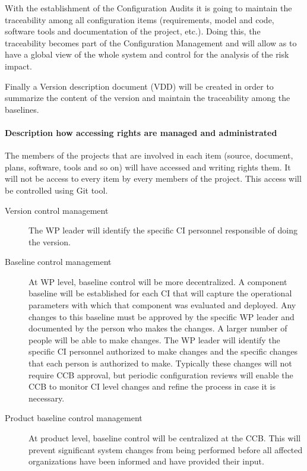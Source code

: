 \documentclass{template/openetcs_article}
\begin{document}
With the establishment of the Configuration Audits it is going to maintain the traceability among all configuration items (requirements, model and code, software tools and documentation of the project, etc.). Doing this, the traceability becomes part of the Configuration Management and will allow as to have a global view of the whole system and control for the analysis of the risk impact.



Finally a Version description document (VDD) will be created in order to summarize the content of the version and maintain the traceability among the baselines.


\paragraph{Description how accessing rights are managed and administrated}

The members of the projects that are involved in each item (source, document, plans, software, tools and so on) will have accessed and writing rights them. It will not be access to every item by every members of the project. This access will be controlled using Git tool.

\begin{description}
\item[Version control management]
The WP leader will identify the specific CI personnel responsible of doing the version.

\item[Baseline control management]
At WP level, baseline control will be more decentralized. A component baseline will be established for each CI that will capture the operational parameters with which that component was evaluated and deployed.  Any changes to this baseline must be approved by the specific WP leader and documented by the person who makes the changes. A larger number of people will be able to make changes. The WP leader will identify the specific CI personnel authorized to make changes and the specific changes that each person is authorized to make. Typically these changes will not require CCB approval, but periodic configuration reviews will enable the CCB to monitor CI level changes and refine the process in case it is necessary.

\item[Product baseline control management]
At product level, baseline control will be centralized at the CCB. This will prevent significant system changes from being performed before all affected organizations have been informed and have provided their input.
\end{description}
\end{document}
